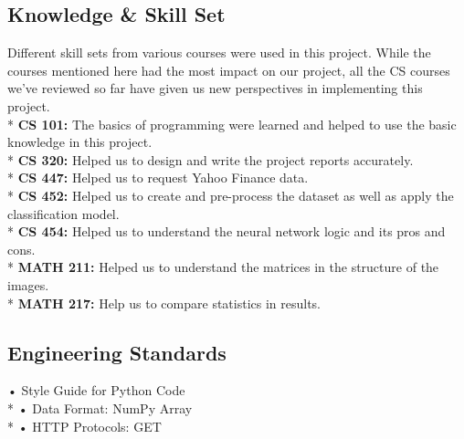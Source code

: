 \documentclass{article}
\begin{document}
\subsection{Knowledge \& Skill Set}
Different skill sets from various courses were used in this project. While the courses mentioned here had the most impact on our project, all the CS courses we've reviewed so far have given us new perspectives in implementing this project.\vspace{0.2cm} \\*
\textbf{CS 101:} The basics of programming were learned and helped to use the basic knowledge in this project.\vspace{0.1cm} \\*
\textbf{CS 320:} Helped us to design and write the project reports accurately.\vspace{0.1cm}\\*
\textbf{CS 447:} Helped us to request Yahoo Finance data. \vspace{0.1cm}\\*
\textbf{CS 452:} Helped us to create and pre-process the dataset as well as apply the classification model. \vspace{0.1cm}\\*
\textbf{CS 454:} Helped us to understand the neural network logic and its pros and cons. \vspace{0.1cm}\\*
\textbf{MATH 211:} Helped us to understand the matrices in the structure of the images. \vspace{0.1cm} \\*
\textbf{MATH 217:} Help us to compare statistics in results.
\subsection{Engineering Standards}
• Style Guide for Python Code\\*
• Data Format: NumPy Array\\*
• HTTP Protocols: GET
\end{document}

